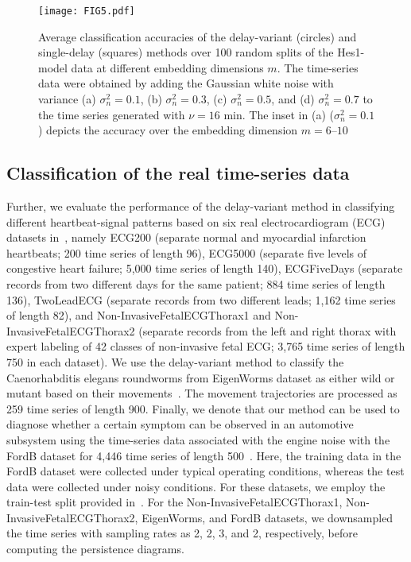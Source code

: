 \documentclass[twocolumn,pre,amsmath,amssymb]{revtex4-1}
\begin{document}
\begin{figure}
	\texttt{[image: FIG5.pdf]}
	
	\protect\caption{
	Average classification accuracies of the delay-variant (circles) and single-delay (squares) methods 
	over 100 random splits of the Hes1-model data at different embedding dimensions $m$.
	The time-series data were obtained by adding the Gaussian white noise 
	with variance  (a) $\sigma^2_n=0.1$, (b) $\sigma^2_n=0.3$, (c) $\sigma^2_n=0.5$, and (d) $\sigma^2_n=0.7$
	to the time series generated with $\nu=16$ min.
	The inset in (a) ($\sigma^2_n=0.1$) depicts the accuracy over the embedding dimension $m=6\text{--}10$}
		\label{fig:hesmodel_acc:noise}
\end{figure}
\subsection{Classification of the real time-series data}
Further, we evaluate the performance of the delay-variant method 
in classifying different heartbeat-signal patterns based on six real electrocardiogram (ECG) datasets in~\cite{UCRarchive}, 
namely ECG200 (separate normal and myocardial infarction heartbeats; 200 time series of length 96), 
ECG5000 (separate five levels of congestive heart failure; 5,000 time series of length 140), 
ECGFiveDays (separate records from two different days for the same patient; 884 time series of length 136), 
TwoLeadECG (separate records from two different leads; 1,162 time series of length 82), 
and Non-InvasiveFetalECGThorax1 and Non-InvasiveFetalECGThorax2 
(separate records from the left and right thorax with expert labeling 
of 42 classes of non-invasive fetal ECG; 3,765 time series of length 750 in each dataset).
We use the delay-variant method to classify the Caenorhabditis elegans roundworms from EigenWorms dataset
as either wild or mutant based on their movements~\cite{brown:elegans:791,yemini:database:2013}.
The movement trajectories are processed as 259 time series of length 900.
Finally, we denote that our method can be used to diagnose whether a certain symptom
can be observed in an automotive subsystem using the time-series data associated with the engine noise
with the FordB dataset for 4,446 time series of length 500~\cite{UCRarchive}.
Here, the training data in the FordB dataset were collected under typical operating conditions, 
whereas the test data were collected under noisy conditions.
For these datasets, we employ the train-test split provided in~\cite{UCRarchive}.
For the Non-InvasiveFetalECGThorax1, Non-InvasiveFetalECGThorax2, EigenWorms, and FordB datasets,
we downsampled the time series with sampling rates as 2, 2, 3, and 2, respectively,
before computing the persistence diagrams.
\end{document}
